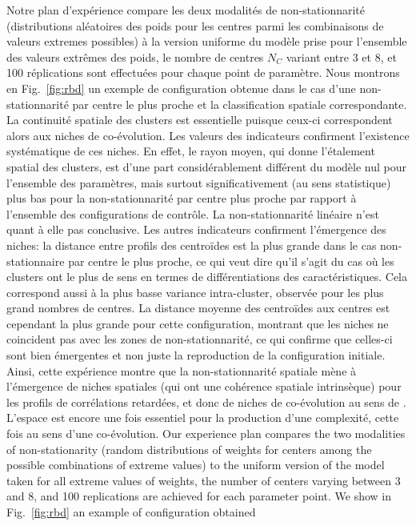 \documentclass[11pt]{article}
\begin{document}
Notre plan d'expérience compare les deux modalités de non-stationnarité (distributions aléatoires des poids pour les centres parmi les combinaisons de valeurs extremes possibles) à la version uniforme du modèle prise pour l'ensemble des valeurs extrêmes des poids, le nombre de centres $N_C$ variant entre 3 et 8, et 100 réplications sont effectuées pour chaque point de paramètre. Nous montrons en Fig.~\ref{fig:rbd} un exemple de configuration obtenue dans le cas d'une non-stationnarité par centre le plus proche et la classification spatiale correspondante. La continuité spatiale des clusters est essentielle puisque ceux-ci correspondent alors aux niches de co-évolution. Les valeurs des indicateurs confirment l'existence systématique de ces niches. En effet, le rayon moyen, qui donne l'étalement spatial des clusters, est d'une part considérablement différent du modèle nul pour l'ensemble des paramètres, mais surtout significativement (au sens statistique) plus bas pour la non-stationnarité par centre plus proche par rapport à l'ensemble des configurations de contrôle. La non-stationnarité linéaire n'est quant à elle pas conclusive. Les autres indicateurs confirment l'émergence des niches: la distance entre profils des centroïdes est la plus grande dans le cas non-stationnaire par centre le plus proche, ce qui veut dire qu'il s'agit du cas où les clusters ont le plus de sens en termes de différentiations des caractéristiques. Cela correspond aussi à la plus basse variance intra-cluster, observée pour les plus grand nombres de centres. La distance moyenne des centroïdes aux centres est cependant la plus grande pour cette configuration, montrant que les niches ne coincident pas avec les zones de non-stationnarité, ce qui confirme que celles-ci sont bien émergentes et non juste la reproduction de la configuration initiale. Ainsi, cette expérience montre que la non-stationnarité spatiale mène à l'émergence de niches spatiales (qui ont une cohérence spatiale intrinsèque) pour les profils de corrélations retardées, et donc de niches de co-évolution au sens de \cite{raimbault2018caracterisation}. L'espace est encore une fois essentiel pour la production d'une complexité, cette fois au sens d'une co-évolution.
Our experience plan compares the two modalities of non-stationarity (random distributions of weights for centers among the possible combinations of extreme values) to the uniform version of the model taken for all extreme values of weights, the number of centers varying between 3 and 8, and 100 replications are achieved for each parameter point. We show in Fig.~\ref{fig:rbd} an example of configuration obtained
\end{document}
